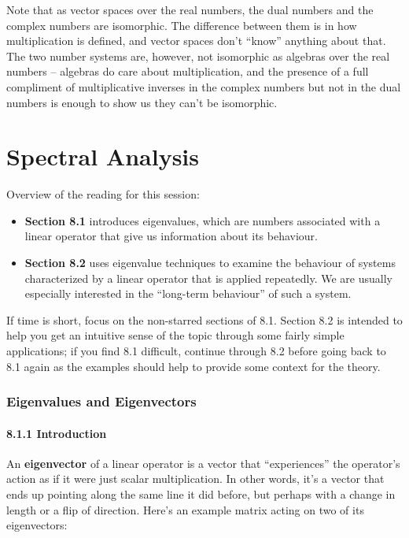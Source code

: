 \documentclass[oneside,english]{amsbook}
\numberwithin{section}{chapter}
\theoremstyle{plain}
\theoremstyle{definition}
\begin{document}
Note that as vector spaces over the real numbers, the dual numbers and
the complex numbers are isomorphic. The difference between them is in
how multiplication is defined, and vector spaces don't ``know'' anything
about that. The two number systems are, however, not isomorphic as
algebras over the real numbers -- algebras do care about multiplication,
and the presence of a full compliment of multiplicative inverses in the
complex numbers but not in the dual numbers is enough to show us they
can't be isomorphic.

\chapter{Spectral Analysis}

Overview of the reading for this session:

\begin{itemize}
	\item
	\textbf{Section 8.1} introduces eigenvalues, which are numbers
	associated with a linear operator that give us information about its
	behaviour.
	\item
	\textbf{Section 8.2} uses eigenvalue techniques to examine the
	behaviour of systems characterized by a linear operator that is
	applied repeatedly. We are usually especially interested in the
	``long-term behaviour'' of such a system.
\end{itemize}

If time is short, focus on the non-starred sections of 8.1. Section 8.2
is intended to help you get an intuitive sense of the topic through some
fairly simple applications; if you find 8.1 difficult, continue through
8.2 before going back to 8.1 again as the examples should help to
provide some context for the theory.

\subsection{Eigenvalues and Eigenvectors}

\subsubsection{8.1.1 Introduction}\label{introduction-1}

An \textbf{eigenvector} of a linear operator is a vector that
``experiences'' the operator's action as if it were just scalar
multiplication. In other words, it's a vector that ends up pointing
along the same line it did before, but perhaps with a change in length
or a flip of direction. Here's an example matrix acting on two of its
eigenvectors:
\end{document}
